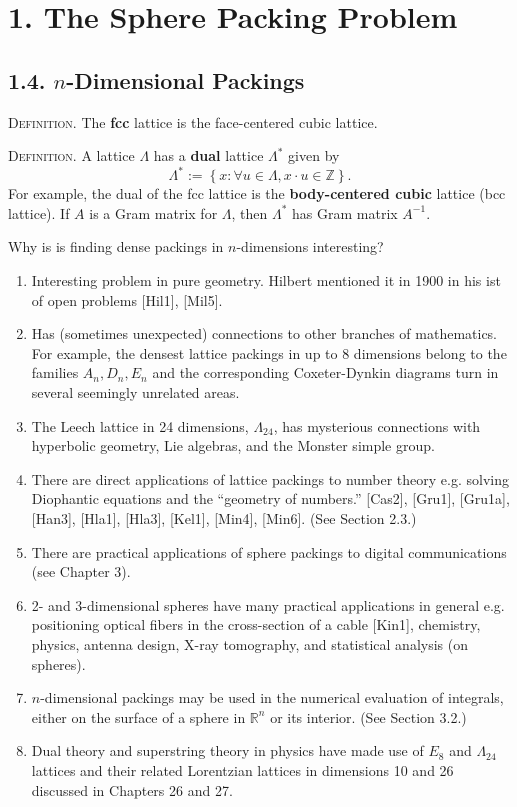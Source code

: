 \documentclass{article}
\newcommand{\Z}{\mathbb{Z}}
\newcommand{\R}{\mathbb{R}}
\renewcommand{\i}{^{-1}}
\newcommand{\set}[1]{\left\{ #1 \right\}}
\newcommand{\Leech}{\Lambda_{24}}
\newcommand{\header}[1]{\noindent\textsc{#1.} }
\begin{document}
\section*{1. The Sphere Packing Problem}

\subsection*{1.4. $n$-Dimensional Packings}

\header{Definition}
The \textbf{fcc} lattice is the face-centered cubic lattice.

\header{Definition}
A lattice $\Lambda$ has a \textbf{dual} lattice $\Lambda^*$ given by
$$ \Lambda^* := \set{ x : \forall u \in \Lambda, x \cdot u \in \Z }. $$
For example, the dual of the fcc lattice is the \textbf{body-centered cubic} lattice (bcc lattice).
If $A$ is a Gram matrix for $\Lambda$, then $\Lambda^*$ has Gram matrix $A\i$.

Why is is finding dense packings in $n$-dimensions interesting?
\begin{enumerate}
  \item
  Interesting problem in pure geometry.
  Hilbert mentioned it in 1900 in his ist of open problems [Hil1], [Mil5].

  \item
  Has (sometimes unexpected) connections to other branches of mathematics.
  For example, the densest lattice packings in up to 8 dimensions belong to the families $A_n, D_n, E_n$ and the corresponding Coxeter-Dynkin diagrams turn in several seemingly unrelated areas.

  \item
  The Leech lattice in 24 dimensions, $\Leech$, has mysterious connections with hyperbolic geometry, Lie algebras, and the Monster simple group.

  \item
  There are direct applications of lattice packings to number theory e.g. solving Diophantic equations and the ``geometry of numbers.'' [Cas2], [Gru1], [Gru1a], [Han3], [Hla1], [Hla3], [Kel1], [Min4], [Min6].
  (See Section 2.3.)

  \item
  There are practical applications of sphere packings to digital communications (see Chapter 3).

  \item
  2- and 3-dimensional spheres have many practical applications in general e.g. positioning optical fibers in the cross-section of a cable [Kin1], chemistry, physics, antenna design, X-ray tomography, and statistical analysis (on spheres).

  \item
  $n$-dimensional packings may be used in the numerical evaluation of integrals, either on the surface of a sphere in $\R^n$ or its interior. (See Section 3.2.)

  \item
  Dual theory and superstring theory in physics have made use of $E_8$ and $\Leech$ lattices and their related Lorentzian lattices in dimensions 10 and 26 discussed in Chapters 26 and 27.

\end{enumerate}
\end{document}
